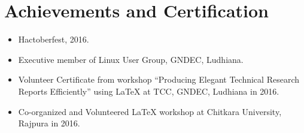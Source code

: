\documentclass[]{friggeri-cv}
\begin{document}
\section{Achievements and Certification}
\begin{itemize}
\item Hactoberfest, 2016.
\item Executive member of Linux User Group, GNDEC, Ludhiana.
\item Volunteer Certificate from workshop “Producing Elegant Technical
Research Reports Efficiently” using
LaTeX at TCC, GNDEC, Ludhiana in 2016.
\item Co-organized and Volunteered LaTeX workshop at Chitkara
University, Rajpura in 2016.
\end{itemize}
\end{document}
